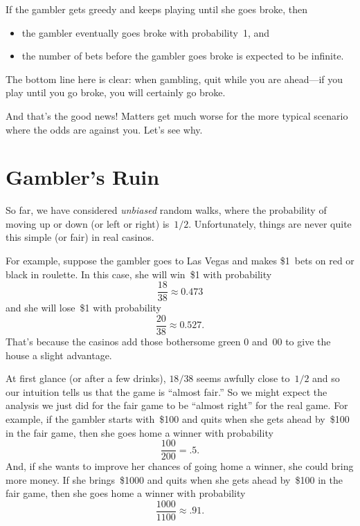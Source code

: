 If the gambler gets greedy and keeps playing until she goes broke,
then
\begin{itemize}

\item

the gambler eventually goes broke with probability~1, and

\item
the number of bets before the gambler goes broke is expected to be
infinite.

\end{itemize}

The bottom line here is clear: when gambling, quit while you are
ahead---if you play until you go broke, you will certainly go broke.

And that's the good news!  Matters get much worse for the more typical
scenario where the odds are against you.  Let's see why.

\section{Gambler's Ruin}

So far, we have considered \emph{unbiased} random walks, where the
probability of moving up or down (or left or right) is~$1/2$.
Unfortunately, things are never quite this simple (or fair) in real
casinos.

For example, suppose the gambler goes to Las Vegas and makes \$1~bets
on red or black in roulette.  In this case, she will win~\$1 with
probability
\begin{equation*}
    \frac{18}{38} \approx 0.473
\end{equation*}
and she will lose~\$1 with probability
\begin{equation*}
    \frac{20}{38} \approx 0.527.
\end{equation*}
That's because the casinos add those bothersome green 0 and~00 to give
the house a slight advantage.

At first glance (or after a few drinks), $18/38$ seems awfully close
to~$1/2$ and so our intuition tells us that the game is ``almost
fair.''  So we might expect the analysis we just did for the fair game
to be ``almost right'' for the real game.  For example, if the gambler
starts with~\$100 and quits when she gets ahead by~\$100 in the fair
game, then she goes home a winner with probability
\begin{equation*}
    \frac{100}{200} = .5.
\end{equation*}
And, if she wants to improve her chances of going home a winner, she
could bring more money.  If she brings~\$1000 and quits when she gets
ahead by~\$100 in the fair game, then she goes home a winner with
probability
\begin{equation*}
    \frac{1000}{1100} \approx .91.
\end{equation*}

